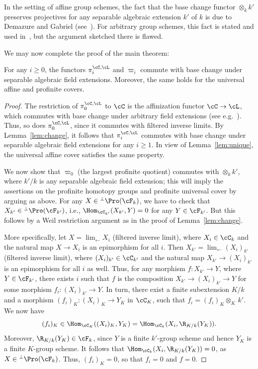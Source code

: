 \begin{rema}\label{rem:change}
In the setting of affine group schemes, the fact that the base change functor $\otimes_k k'$ preserves projectives for any separable algebraic extension $k'$ of $k$ is due to Demazure and Gabriel (see~\cite[V.3.2.1]{DG}). For arbitrary group schemes, this fact is stated and used in~\cite[p.~437]{Milne}, but the argument sketched there is flawed.
\end{rema}

We may now complete the proof of the main theorem:

\begin{prop}\label{prop:separable}
For any $i \geq 0$, the functors $\pi_i^{\cC,\cL}$ and $\varpi_i$ commute with base change under separable algebraic field extensions. Moreover, the same holds for the universal affine and profinite covers.
\end{prop}

\begin{proof}
The restriction of $\pi_0^{\cC,\cL}$ to $\cC$ is the affinization functor $\cC \to \cL$, which commutes with base change under arbitrary field extensions (see e.g.~\cite[III.3.8.1]{DG}). Thus, so does $\pi_0^{\cC,\cL}$, since it commutes with filtered inverse limits. By Lemma~\ref{lem:change}, it follows that $\pi_i^{\cC,\cL}$ commutes with base change under separable algebraic field extensions for any $i \geq 1$. In view of Lemma~\ref{lem:unique}, the universal affine cover satisfies the same property.

We now show that $\varpi_0$ (the largest profinite quotient) commutes with $\otimes_k k'$, where $k'/k$ is any separable algebraic field extension; this will imply the assertions on the profinite homotopy groups and profinite universal cover by arguing as above. For any $X \in {^{\perp}\Pro(\cF_k)}$, we have to check that $X_{k'} \in {^{\perp}\Pro(\cF_{k'})}$, i.e., $\Hom_{\cC_{k'}}(X_{k'},Y) = 0$ for any $Y \in \cF_{k'}$. But this follows by a Weil restriction argument as in the proof of Lemma~\ref{lem:change}.

More specifically, let $X = \lim_{\leftarrow} X_i$ (filtered inverse limit), where $X_i \in \cC_k$ and the natural map $X \to X_i$ is an epimorphism for all $i$. Then $X_{k'} = \lim_{\leftarrow} (X_i)_{k'}$ (filtered inverse limit), where $(X_i)_{k'} \in \cC_{k'}$ and the natural map $X_{k'} \to (X_i)_{k'}$ is an epimorphism for all $i$ as well. Thus, for any morphism $f : X_{k'} \to Y$, where $Y \in \cF_{k'}$, there exists $i$ such that $f$ is the composition $X_{k'} \to (X_i)_{k'} \to Y$ for some morphism $f_i : (X_i)_{k'} \to Y$. In turn, there exist a finite subextension $K/k$ and a morphism $(f_i)_K : (X_i)_K \to Y_K$ in $\cC_K$, such that $f_i = (f_i)_K \otimes_K \, k'$. We now have
\[
(f_i)_K \in \Hom_{\cC_K}((X_i)_K, Y_K) = \Hom_{\cC_k}(X_i, \R_{K/k}(Y_K)).
\]
Moreover, $\R_{K/k}(Y_K) \in \cF_k$, since $Y$ is a finite $k'$-group scheme and hence $Y_K$ is a finite $K$-group scheme. It follows that $\Hom_{\cC_k}(X_i, \R_{K/k}(Y_K)) = 0$, as $X \in {^{\perp}\Pro(\cF_k)}$. Thus, $(f_i)_K = 0$, so that $f_i = 0$ and $f = 0$.
\end{proof}


